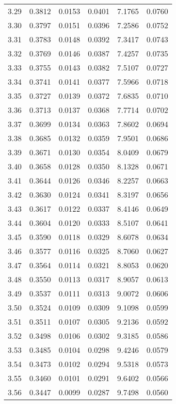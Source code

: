 \documentclass{article}
\begin{document}
\begin{longtable}{cccccc}
3.29 & 0.3812 & 0.0153 & 0.0401 & 7.1765 & 0.0760 \\
3.30 & 0.3797 & 0.0151 & 0.0396 & 7.2586 & 0.0752 \\
3.31 & 0.3783 & 0.0148 & 0.0392 & 7.3417 & 0.0743 \\
3.32 & 0.3769 & 0.0146 & 0.0387 & 7.4257 & 0.0735 \\
3.33 & 0.3755 & 0.0143 & 0.0382 & 7.5107 & 0.0727 \\
3.34 & 0.3741 & 0.0141 & 0.0377 & 7.5966 & 0.0718 \\
3.35 & 0.3727 & 0.0139 & 0.0372 & 7.6835 & 0.0710 \\
3.36 & 0.3713 & 0.0137 & 0.0368 & 7.7714 & 0.0702 \\
3.37 & 0.3699 & 0.0134 & 0.0363 & 7.8602 & 0.0694 \\
3.38 & 0.3685 & 0.0132 & 0.0359 & 7.9501 & 0.0686 \\
3.39 & 0.3671 & 0.0130 & 0.0354 & 8.0409 & 0.0679 \\
3.40 & 0.3658 & 0.0128 & 0.0350 & 8.1328 & 0.0671 \\
3.41 & 0.3644 & 0.0126 & 0.0346 & 8.2257 & 0.0663 \\
3.42 & 0.3630 & 0.0124 & 0.0341 & 8.3197 & 0.0656 \\
3.43 & 0.3617 & 0.0122 & 0.0337 & 8.4146 & 0.0649 \\
3.44 & 0.3604 & 0.0120 & 0.0333 & 8.5107 & 0.0641 \\
3.45 & 0.3590 & 0.0118 & 0.0329 & 8.6078 & 0.0634 \\
3.46 & 0.3577 & 0.0116 & 0.0325 & 8.7060 & 0.0627 \\
3.47 & 0.3564 & 0.0114 & 0.0321 & 8.8053 & 0.0620 \\
3.48 & 0.3550 & 0.0113 & 0.0317 & 8.9057 & 0.0613 \\
3.49 & 0.3537 & 0.0111 & 0.0313 & 9.0072 & 0.0606 \\
3.50 & 0.3524 & 0.0109 & 0.0309 & 9.1098 & 0.0599 \\
3.51 & 0.3511 & 0.0107 & 0.0305 & 9.2136 & 0.0592 \\
3.52 & 0.3498 & 0.0106 & 0.0302 & 9.3185 & 0.0586 \\
3.53 & 0.3485 & 0.0104 & 0.0298 & 9.4246 & 0.0579 \\
3.54 & 0.3473 & 0.0102 & 0.0294 & 9.5318 & 0.0573 \\
3.55 & 0.3460 & 0.0101 & 0.0291 & 9.6402 & 0.0566 \\
3.56 & 0.3447 & 0.0099 & 0.0287 & 9.7498 & 0.0560 \\

\end{longtable}
\end{document}
